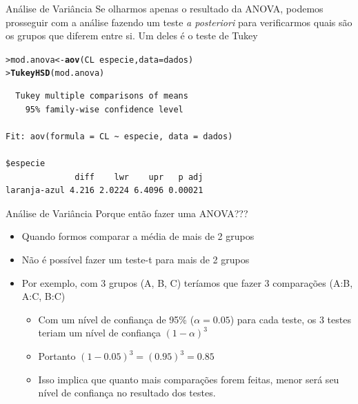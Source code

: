 \documentclass[10pt]{beamer}\usepackage[]{graphicx}\usepackage[]{color}
\makeatletter
\newcommand{\hlopt}[1]{\textcolor[rgb]{0,0,0}{#1}}%
\newcommand{\hlstd}[1]{\textcolor[rgb]{0.345,0.345,0.345}{#1}}%
\newcommand{\hlkwb}[1]{\textcolor[rgb]{0.69,0.353,0.396}{#1}}%
\newcommand{\hlkwc}[1]{\textcolor[rgb]{0.333,0.667,0.333}{#1}}%
\newcommand{\hlkwd}[1]{\textcolor[rgb]{0.282,0.239,0.545}{\textbf{#1}}}%
\newenvironment{kframe}{%
 \def\at@end@of@kframe{}%
 \ifinner\ifhmode%
  \def\at@end@of@kframe{\end{minipage}}%
  \begin{minipage}{\columnwidth}%
 \fi\fi%
 \def\FrameCommand##1{\hskip\@totalleftmargin \hskip-\fboxsep
 \colorbox{shadecolor}{##1}\hskip-\fboxsep
     \hskip-\linewidth \hskip-\@totalleftmargin \hskip\columnwidth}%
 \MakeFramed {\advance\hsize-\width
   \@totalleftmargin\z@ \linewidth\hsize
   \@setminipage}}%
 {\par\unskip\endMakeFramed%
 \at@end@of@kframe}
\newenvironment{knitrout}{}{} %
\makeatother
\begin{document}
\begin{frame}[fragile=singleslide]{Análise de Variância}
Se olharmos apenas o resultado da ANOVA, podemos prosseguir com a
análise fazendo um teste \textit{a posteriori} para verificarmos quais
são os grupos que diferem entre si. Um deles é o teste de Tukey
\begin{knitrout}\small
{}\color{fgcolor}\begin{kframe}
\begin{alltt}
\hlstd{> }\hlstd{mod.anova} \hlkwb{<-} \hlkwd{aov}\hlstd{(CL} \hlopt{~} \hlstd{especie,} \hlkwc{data} \hlstd{= dados)}
\hlstd{> }\hlkwd{TukeyHSD}\hlstd{(mod.anova)}
\end{alltt}
\begin{verbatim}
  Tukey multiple comparisons of means
    95% family-wise confidence level

Fit: aov(formula = CL ~ especie, data = dados)

$especie
              diff    lwr    upr   p adj
laranja-azul 4.216 2.0224 6.4096 0.00021
\end{verbatim}
\end{kframe}
\end{knitrout}

\end{frame}

\begin{frame}[fragile=singleslide]{Análise de Variância}
Porque então fazer uma ANOVA???
\begin{itemize}
\item Quando formos comparar a média de mais de 2 grupos
\item Não é possível fazer um teste-t para mais de 2 grupos
\item Por exemplo, com 3 grupos (A, B, C) teríamos que fazer 3
  comparações (A:B, A:C, B:C)
  \begin{itemize}
  \item Com um nível de confiança de 95\% ($\alpha = 0.05$)
    para cada teste, os 3 testes teriam um nível de confiança
    $(1-\alpha)^3$
  \item Portanto $(1-0.05)^3 = (0.95)^3 = 0.85$
  \item Isso implica que quanto mais comparações forem feitas, menor
    será seu nível de confiança no resultado dos testes.
  \end{itemize}
\end{itemize}
\end{frame}
\end{document}

